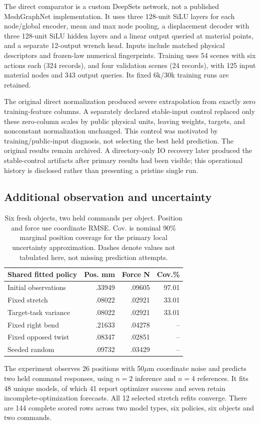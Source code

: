 \documentclass[10pt,twocolumn,letterpaper]{article}
\begin{document}
The direct comparator is a custom DeepSets network, not a published MeshGraphNet implementation. It uses three 128-unit SiLU layers for each node/global encoder, mean and max node pooling, a displacement decoder with three 128-unit SiLU hidden layers and a linear output queried at material points, and a separate 12-output wrench head. Inputs include matched physical descriptors and frozen-law numerical fingerprints. Training uses 54 scenes with six actions each (324 records), and four validation scenes (24 records), with 125 input material nodes and 343 output queries. Its fixed 6k/30k training runs are retained.

The original direct normalization produced severe extrapolation from exactly zero training-feature columns. A separately declared stable-input control replaced only these zero-column scales by public physical units, leaving weights, targets, and nonconstant normalization unchanged. This control was motivated by training/public-input diagnosis, not selecting the best held prediction. The original results remain archived. A directory-only IO recovery later produced the stable-control artifacts after primary results had been visible; this operational history is disclosed rather than presenting a pristine single run.

\subsection{Additional observation and uncertainty}
\begin{table}[t]
\centering\small
\begin{tabular}{lrrr}
\toprule
Shared fitted policy & Pos. mm & Force N & Cov.\%\\
\midrule
Initial observations & .33949 & .09605 &97.01\\
Fixed stretch & .08022 & .02921 &33.01\\
Target-task variance & .08022 & .02921 &33.01\\
Fixed right bend & .21633 & .04278 & --\\
Fixed opposed twist & .08347 & .02851 & --\\
Seeded random & .09732 & .03429 & --\\
\bottomrule
\end{tabular}
\caption{Six fresh objects, two held commands per object. Position and force use coordinate RMSE. Cov. is nominal 90\% marginal position coverage for the primary local uncertainty approximation. Dashes denote values not tabulated here, not missing prediction attempts.}
\end{table}
The experiment observes 26 positions with 50$\mu$m coordinate noise and predicts two held command responses, using $n=2$ inference and $n=4$ references. It fits 48 unique models, of which 41 report optimizer success and seven retain incomplete-optimization forecasts. All 12 selected stretch refits converge. There are 144 complete scored rows across two model types, six policies, six objects and two commands.
\end{document}
